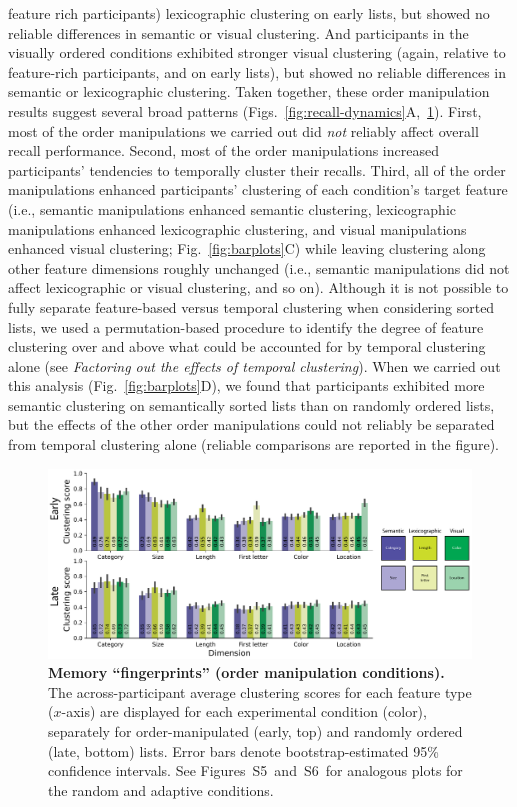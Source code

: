 \documentclass[11pt]{article}
\newcommand{\fingerprintsRandom}{S5}
\newcommand{\fingerprintsAdaptive}{S6}
\begin{document}
feature rich participants) lexicographic clustering on early lists, but showed
no reliable differences in semantic or visual clustering. And participants in
the visually ordered conditions exhibited stronger visual clustering (again,
relative to feature-rich participants, and on early lists), but showed no
reliable differences in semantic or lexicographic clustering. Taken together,
these order manipulation results suggest several broad patterns
(Figs.~\ref{fig:recall-dynamics}A,~\ref{fig:fingerprints}). First, most of the
order manipulations we carried out did \textit{not} reliably affect overall
recall performance. Second, most of the order manipulations increased
participants' tendencies to temporally cluster their recalls. Third, all of the
order manipulations enhanced participants' clustering of each condition's
target feature (i.e., semantic manipulations enhanced semantic clustering,
lexicographic manipulations enhanced lexicographic clustering, and visual
manipulations enhanced visual clustering; Fig.~\ref{fig:barplots}C) while
leaving clustering along other feature dimensions roughly unchanged (i.e.,
semantic manipulations did not affect lexicographic or visual clustering, and
so on). Although it is not possible to fully separate feature-based versus
temporal clustering when considering sorted lists, we used a permutation-based
procedure to identify the degree of feature clustering over and above what
could be accounted for by temporal clustering alone (see \textit{Factoring out
the effects of temporal clustering}). When we carried out this analysis
(Fig.~\ref{fig:barplots}D), we found that participants exhibited more semantic
clustering on semantically sorted lists than on randomly ordered lists, but the
effects of the other order manipulations could not reliably be separated from
temporal clustering alone (reliable comparisons are reported in the figure).

\begin{figure}[tp] \centering
    \includegraphics[width=\textwidth]{figures/fingerprints}

\caption{\textbf{Memory ``fingerprints'' (order manipulation conditions).} The
across-participant average clustering scores for each feature type ($x$-axis) are
displayed for each experimental condition (color), separately for order-manipulated
(early, top) and randomly ordered (late, bottom) lists. Error bars
denote bootstrap-estimated 95\% confidence intervals. See
Figures~\fingerprintsRandom~and~\fingerprintsAdaptive~for analogous plots for
the random and adaptive conditions.} \label{fig:fingerprints}

\end{figure}
\end{document}
